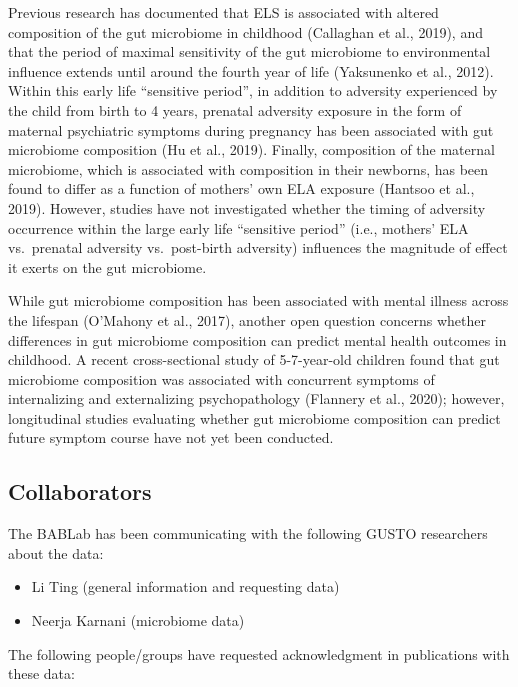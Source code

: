 \documentclass[
]{book}
\providecommand{\tightlist}{%
  \setlength{\itemsep}{0pt}\setlength{\parskip}{0pt}}
\begin{document}
Previous research has documented that ELS is associated with altered composition of the gut microbiome in childhood (Callaghan et al., 2019), and that the period of maximal sensitivity of the gut microbiome to environmental influence extends until around the fourth year of life (Yaksunenko et al., 2012). Within this early life ``sensitive period'', in addition to adversity experienced by the child from birth to 4 years, prenatal adversity exposure in the form of maternal psychiatric symptoms during pregnancy has been associated with gut microbiome composition (Hu et al., 2019). Finally, composition of the maternal microbiome, which is associated with composition in their newborns, has been found to differ as a function of mothers' own ELA exposure (Hantsoo et al., 2019). However, studies have not investigated whether the timing of adversity occurrence within the large early life ``sensitive period'' (i.e., mothers' ELA vs.~prenatal adversity vs.~post-birth adversity) influences the magnitude of effect it exerts on the gut microbiome.

While gut microbiome composition has been associated with mental illness across the lifespan (O'Mahony et al., 2017), another open question concerns whether differences in gut microbiome composition can predict mental health outcomes in childhood. A recent cross-sectional study of 5-7-year-old children found that gut microbiome composition was associated with concurrent symptoms of internalizing and externalizing psychopathology (Flannery et al., 2020); however, longitudinal studies evaluating whether gut microbiome composition can predict future symptom course have not yet been conducted.

\hypertarget{collaborators}{%
\subsection{Collaborators}\label{collaborators}}

The BABLab has been communicating with the following GUSTO researchers about the data:

\begin{itemize}
\tightlist
\item
  Li Ting (general information and requesting data)
\item
  Neerja Karnani (microbiome data)
\end{itemize}

The following people/groups have requested acknowledgment in publications with these data:
\end{document}

